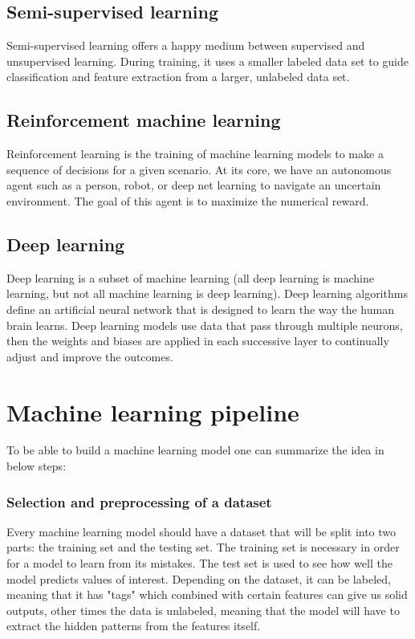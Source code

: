 \documentclass[a4paper,oneside,openright,11pt]{book}
\begin{document}
\subsection{Semi-supervised learning }

Semi-supervised learning offers a happy medium between supervised and unsupervised learning. During training, it uses a smaller labeled data set to guide classification and feature extraction from a larger, unlabeled data set.

\subsection{Reinforcement machine learning}

Reinforcement learning is the training of machine learning models to make a sequence of decisions for a given scenario.
At its core, we have an autonomous agent such as a person, robot, or deep net learning to navigate an uncertain environment. The goal of this agent is to maximize the numerical reward.


\subsection{Deep learning}

Deep learning is a subset of machine learning (all deep learning is machine learning, but not all machine learning is deep learning). Deep learning algorithms define an artificial neural network that is designed to learn the way the human brain learns. Deep learning models use data that pass through multiple neurons, then the weights and biases are applied in each successive layer to continually adjust and improve the outcomes.


\section{Machine learning pipeline}

To be able to build a machine learning model one can summarize the idea in below steps\cite{what_ML_IBM}:

\subsubsection{Selection and preprocessing of a dataset}

Every machine learning model should have a dataset that will be split into two parts: the training set and the testing set. The training set is necessary in order for a model to learn from its mistakes. The test set is used to see how well the model predicts values of interest. Depending on the dataset, it can be labeled, meaning that it has "tags" which combined with certain features can give us solid outputs, other times the data is unlabeled, meaning that the model will have to extract the hidden patterns from the features itself.
\end{document}
